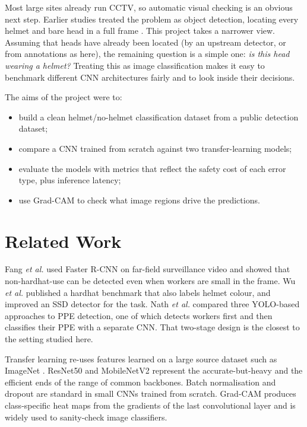 \documentclass[conference]{IEEEtran}
\begin{document}
Most large sites already run CCTV, so automatic visual checking is an obvious next step. Earlier studies treated the problem as object detection, locating every helmet and bare head in a full frame \cite{fang2018detecting,wu2019automatic,nath2020deep}. This project takes a narrower view. Assuming that heads have already been located (by an upstream detector, or from annotations as here), the remaining question is a simple one: \emph{is this head wearing a helmet?} Treating this as image classification makes it easy to benchmark different CNN architectures fairly and to look inside their decisions.

The aims of the project were to:
\begin{itemize}
  \item build a clean helmet/no-helmet classification dataset from a public detection dataset;
  \item compare a CNN trained from scratch against two transfer-learning models;
  \item evaluate the models with metrics that reflect the safety cost of each error type, plus inference latency;
  \item use Grad-CAM to check what image regions drive the predictions.
\end{itemize}

\section{Related Work}
Fang \emph{et al.} \cite{fang2018detecting} used Faster R-CNN on far-field surveillance video and showed that non-hardhat-use can be detected even when workers are small in the frame. Wu \emph{et al.} \cite{wu2019automatic} published a hardhat benchmark that also labels helmet colour, and improved an SSD detector for the task. Nath \emph{et al.} \cite{nath2020deep} compared three YOLO-based approaches to PPE detection, one of which detects workers first and then classifies their PPE with a separate CNN. That two-stage design is the closest to the setting studied here.

Transfer learning \cite{pan2010survey} re-uses features learned on a large source dataset such as ImageNet \cite{deng2009imagenet}. ResNet50 \cite{he2016deep} and MobileNetV2 \cite{sandler2018mobilenetv2} represent the accurate-but-heavy and the efficient ends of the range of common backbones. Batch normalisation \cite{ioffe2015batch} and dropout \cite{srivastava2014dropout} are standard in small CNNs trained from scratch. Grad-CAM \cite{selvaraju2017gradcam} produces class-specific heat maps from the gradients of the last convolutional layer and is widely used to sanity-check image classifiers.
\end{document}
